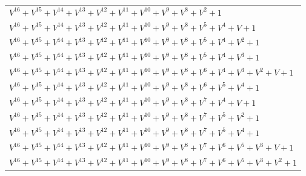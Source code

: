 \documentclass[12pt]{article}
\begin{document}
\begin{adjustwidth}{-4cm}{}
\begin{center}
\begin{longtable}{|l|}
$V^{16}  +V^{15}  +V^{14}  +V^{13}  +V^{12}  +V^{11}  +V^{10}  +V^{9}  +V^{8}  +V^{2}  + 1$ \\
$V^{16}  +V^{15}  +V^{14}  +V^{13}  +V^{12}  +V^{11}  +V^{10}  +V^{9}  +V^{8}  +V^{5}  +V^{4}  + V + 1$ \\
$V^{16}  +V^{15}  +V^{14}  +V^{13}  +V^{12}  +V^{11}  +V^{10}  +V^{9}  +V^{8}  +V^{5}  +V^{4}  +V^{2}  + 1$ \\
$V^{16}  +V^{15}  +V^{14}  +V^{13}  +V^{12}  +V^{11}  +V^{10}  +V^{9}  +V^{8}  +V^{5}  +V^{4}  +V^{3}  + 1$ \\
$V^{16}  +V^{15}  +V^{14}  +V^{13}  +V^{12}  +V^{11}  +V^{10}  +V^{9}  +V^{8}  +V^{6}  +V^{4}  +V^{3}  +V^{2}  + V + 1$ \\
$V^{16}  +V^{15}  +V^{14}  +V^{13}  +V^{12}  +V^{11}  +V^{10}  +V^{9}  +V^{8}  +V^{6}  +V^{5}  +V^{4}  + 1$ \\
$V^{16}  +V^{15}  +V^{14}  +V^{13}  +V^{12}  +V^{11}  +V^{10}  +V^{9}  +V^{8}  +V^{7}  +V^{4}  + V + 1$ \\
$V^{16}  +V^{15}  +V^{14}  +V^{13}  +V^{12}  +V^{11}  +V^{10}  +V^{9}  +V^{8}  +V^{7}  +V^{5}  +V^{2}  + 1$ \\
$V^{16}  +V^{15}  +V^{14}  +V^{13}  +V^{12}  +V^{11}  +V^{10}  +V^{9}  +V^{8}  +V^{7}  +V^{5}  +V^{4}  + 1$ \\
$V^{16}  +V^{15}  +V^{14}  +V^{13}  +V^{12}  +V^{11}  +V^{10}  +V^{9}  +V^{8}  +V^{7}  +V^{6}  +V^{5}  +V^{3}  + V + 1$ \\
$V^{16}  +V^{15}  +V^{14}  +V^{13}  +V^{12}  +V^{11}  +V^{10}  +V^{9}  +V^{8}  +V^{7}  +V^{6}  +V^{5}  +V^{3}  +V^{2}  + 1$ \\
\hline
\end{longtable}
\end{center}
\end{adjustwidth}
\end{document}
